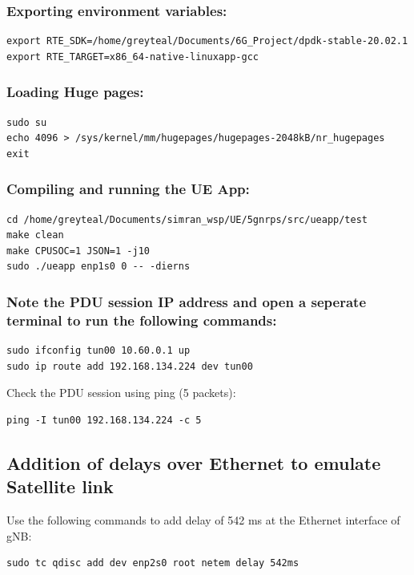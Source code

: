 \subsubsection{Exporting environment variables:}
\begin{lstlisting}
export RTE_SDK=/home/greyteal/Documents/6G_Project/dpdk-stable-20.02.1
export RTE_TARGET=x86_64-native-linuxapp-gcc
\end{lstlisting}

\subsubsection{Loading Huge pages:}
\begin{lstlisting}
sudo su
echo 4096 > /sys/kernel/mm/hugepages/hugepages-2048kB/nr_hugepages
exit
\end{lstlisting}

\subsubsection{Compiling and running the UE App:}
\begin{lstlisting}
cd /home/greyteal/Documents/simran_wsp/UE/5gnrps/src/ueapp/test
make clean
make CPUSOC=1 JSON=1 -j10
sudo ./ueapp enp1s0 0 -- -dierns
\end{lstlisting}

\subsubsection{Note the PDU session IP address and open a seperate terminal to run the following commands:}
\begin{lstlisting}
sudo ifconfig tun00 10.60.0.1 up
sudo ip route add 192.168.134.224 dev tun00
\end{lstlisting}

Check the PDU session using ping (5 packets):
\begin{lstlisting}
ping -I tun00 192.168.134.224 -c 5
\end{lstlisting}

\subsection{Addition of delays over Ethernet to emulate Satellite link}
Use the following commands to add delay of 542 ms at the Ethernet interface of gNB:
\begin{lstlisting}
sudo tc qdisc add dev enp2s0 root netem delay 542ms
\end{lstlisting}


